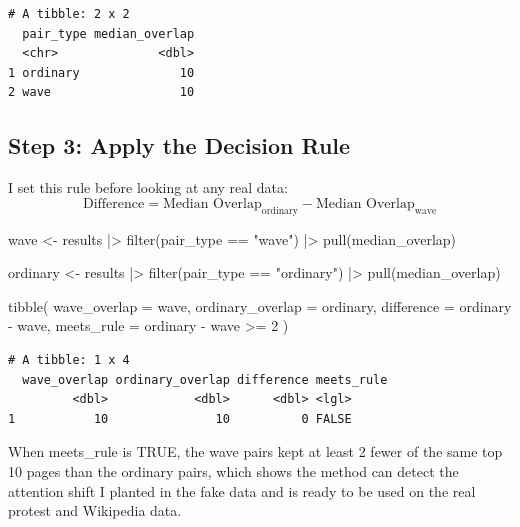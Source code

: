 \documentclass[
  9pt,
  letterpaper,
  DIV=11,
  numbers=noendperiod]{scrartcl}
\newenvironment{Shaded}{\begin{snugshade}}{\end{snugshade}}
\newcommand{\AttributeTok}[1]{\textcolor[rgb]{0.40,0.45,0.13}{#1}}
\newcommand{\DecValTok}[1]{\textcolor[rgb]{0.68,0.00,0.00}{#1}}
\newcommand{\FunctionTok}[1]{\textcolor[rgb]{0.28,0.35,0.67}{#1}}
\newcommand{\NormalTok}[1]{\textcolor[rgb]{0.00,0.23,0.31}{#1}}
\newcommand{\OtherTok}[1]{\textcolor[rgb]{0.00,0.23,0.31}{#1}}
\newcommand{\SpecialCharTok}[1]{\textcolor[rgb]{0.37,0.37,0.37}{#1}}
\newcommand{\StringTok}[1]{\textcolor[rgb]{0.13,0.47,0.30}{#1}}
\begin{document}
\begin{verbatim}
# A tibble: 2 x 2
  pair_type median_overlap
  <chr>              <dbl>
1 ordinary              10
2 wave                  10
\end{verbatim}

\subsection{Step 3: Apply the Decision
Rule}\label{step-3-apply-the-decision-rule}

I set this rule before looking at any real data: \[
\text{Difference} = \text{Median Overlap}_{\text{ordinary}} - \text{Median Overlap}_{\text{wave}}
\]

\begin{Shaded}
\begin{Highlighting}[]
\NormalTok{wave }\OtherTok{\textless{}{-}} 
\NormalTok{  results }\SpecialCharTok{|\textgreater{}}
  \FunctionTok{filter}\NormalTok{(pair\_type }\SpecialCharTok{==} \StringTok{"wave"}\NormalTok{) }\SpecialCharTok{|\textgreater{}}
  \FunctionTok{pull}\NormalTok{(median\_overlap)}

\NormalTok{ordinary }\OtherTok{\textless{}{-}} 
\NormalTok{  results }\SpecialCharTok{|\textgreater{}}
  \FunctionTok{filter}\NormalTok{(pair\_type }\SpecialCharTok{==} \StringTok{"ordinary"}\NormalTok{) }\SpecialCharTok{|\textgreater{}}
  \FunctionTok{pull}\NormalTok{(median\_overlap)}

\FunctionTok{tibble}\NormalTok{(}
  \AttributeTok{wave\_overlap =}\NormalTok{ wave,}
  \AttributeTok{ordinary\_overlap =}\NormalTok{ ordinary,}
  \AttributeTok{difference =}\NormalTok{ ordinary }\SpecialCharTok{{-}}\NormalTok{ wave,}
  \AttributeTok{meets\_rule =}\NormalTok{ ordinary }\SpecialCharTok{{-}}\NormalTok{ wave }\SpecialCharTok{\textgreater{}=} \DecValTok{2}
\NormalTok{)}
\end{Highlighting}
\end{Shaded}

\begin{verbatim}
# A tibble: 1 x 4
  wave_overlap ordinary_overlap difference meets_rule
         <dbl>            <dbl>      <dbl> <lgl>     
1           10               10          0 FALSE     
\end{verbatim}

When meets\_rule is TRUE, the wave pairs kept at least 2 fewer of the
same top 10 pages than the ordinary pairs, which shows the method can
detect the attention shift I planted in the fake data and is ready to be
used on the real protest and Wikipedia data.
\end{document}
